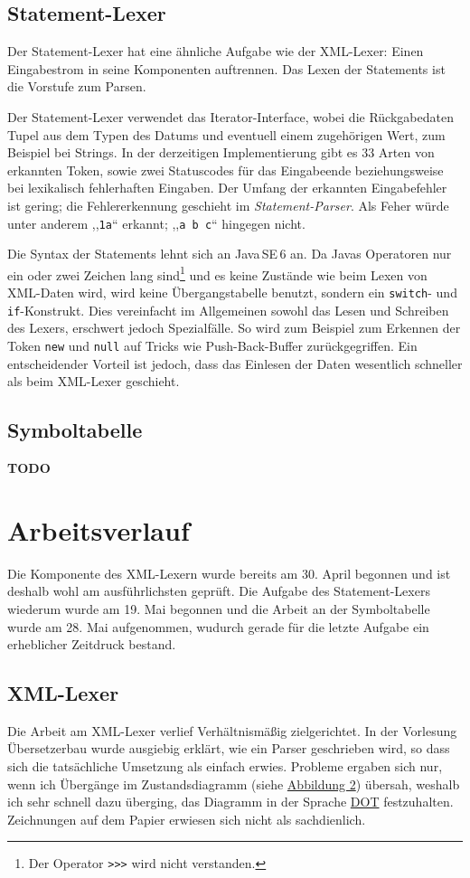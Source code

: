 \documentclass[10pt,a4paper,ngerman,titlepage,tocindentauto]{article}
\newcommand{\TODO}{{\LARGE\bf\color{crimson} TODO}}
\begin{document}
		\subsection{Statement-Lexer}
			Der Statement-Lexer hat eine ähnliche Aufgabe wie der XML-Lexer: Einen Eingabestrom in seine
			Komponenten auftrennen. Das Lexen der Statements ist die Vorstufe zum Parsen.
			
			Der Statement-Lexer verwendet das Iterator-Interface, wobei die Rückgabedaten
			Tupel aus dem Typen des Datums und eventuell einem zugehörigen Wert, zum Beispiel bei Strings.
			In der derzeitigen Implementierung gibt es 33 Arten von erkannten Token, sowie zwei
			Statuscodes für das Eingabeende beziehungsweise bei lexikalisch fehlerhaften Eingaben.
			Der Umfang der erkannten Eingabefehler ist gering; die Fehlererkennung geschieht im
			{\em Statement-Parser}. Als Feher würde unter anderem ,,\verb|1a|`` erkannt; ,,\verb|a b c|`` hingegen nicht.
			
			Die Syntax der Statements lehnt sich an Java\,SE\,6 an. Da Javas Operatoren nur ein oder
			zwei Zeichen lang sind\footnote{Der Operator \texttt{{>}>{>}} wird nicht verstanden.} und es keine Zustände wie beim
			Lexen von XML-Daten wird, wird keine Übergangstabelle benutzt, sondern ein \verb|switch|- und
			\verb|if|-Konstrukt. Dies vereinfacht im Allgemeinen sowohl das Lesen und Schreiben des Lexers,
			erschwert jedoch Spezialfälle. So wird zum Beispiel zum Erkennen der Token \verb|new| und
			\verb|null| auf Tricks wie Push-Back-Buffer zurückgegriffen.
			Ein entscheidender Vorteil ist jedoch, dass das Einlesen der Daten wesentlich schneller
			als beim XML-Lexer geschieht.
	
		\subsection{Symboltabelle}
			\TODO
	
	\section[Arbeitsverlauf]{\hypertarget{Arbeitsverlauf}{Arbeitsverlauf}}
		Die Komponente des XML-Lexern wurde bereits am 30. April begonnen und ist deshalb
		wohl am ausführlichsten geprüft. Die Aufgabe des Statement-Lexers wiederum wurde
		am 19. Mai begonnen und die Arbeit an der Symboltabelle wurde am 28. Mai aufgenommen,
		wudurch gerade für die letzte Aufgabe ein erheblicher Zeitdruck bestand.
	
		\subsection{XML-Lexer}
			Die Arbeit am XML-Lexer verlief Verhältnismäßig zielgerichtet. In der Vorlesung
			Übersetzerbau wurde ausgiebig erklärt, wie ein Parser geschrieben wird, so dass
			sich die tatsächliche Umsetzung als einfach erwies. Probleme ergaben sich nur,
			wenn ich Übergänge im Zustandsdiagramm (siehe \hyperlink{Uebergangsdiagramm_XML_Lexer}{Abbildung 2})
			übersah, weshalb ich sehr schnell dazu überging, das Diagramm in der Sprache
			\href{http://www.graphviz.org/doc/info/lang.html}{DOT} festzuhalten. Zeichnungen auf
			dem Papier erwiesen sich nicht als sachdienlich.
			
\end{document}
